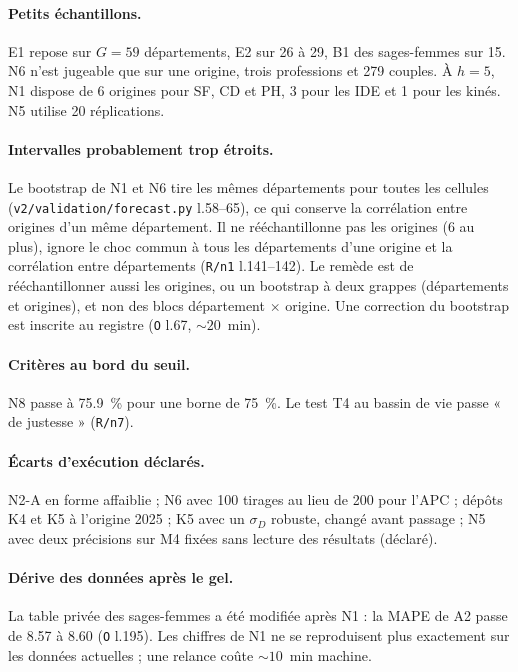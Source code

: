 \paragraph{Petits échantillons.} E1 repose sur $G = 59$\mesure{} départements, E2 sur 26 à
29\mesure, B1 des sages-femmes sur 15\mesure. N6 n'est jugeable que sur une origine, trois
professions et 279\derive{} couples. À $h = 5$, N1 dispose de 6\derive{} origines pour SF, CD et
PH, 3\derive{} pour les IDE et 1\derive{} pour les kinés. N5 utilise 20\suppose{} réplications.

\paragraph{Intervalles probablement trop étroits.} Le bootstrap de N1 et N6 tire les mêmes
départements pour toutes les cellules (\texttt{v2/validation/forecast.py} l.58--65), ce qui conserve
la corrélation entre origines d'un même département. Il ne rééchantillonne pas les origines (6\mesure{}
au plus), ignore le choc commun à tous les départements d'une origine et la corrélation entre
départements (\texttt{R/n1} l.141--142). Le remède est de rééchantillonner aussi les origines, ou un
bootstrap à deux grappes (départements et origines), et non des blocs département $\times$ origine.
Une correction du bootstrap est inscrite au registre (\texttt{O} l.67, $\sim 20$\suppose{}~min).

\paragraph{Critères au bord du seuil.} N8 passe à \num{75.9}\mesure{}~\% pour une borne de
75\suppose{}~\%. Le test T4 au bassin de vie passe « de justesse » (\texttt{R/n7}).

\paragraph{Écarts d'exécution déclarés.} N2-A en forme affaiblie ; N6 avec 100\mesure{} tirages
au lieu de 200\suppose{} pour l'APC ; dépôts K4 et K5 à l'origine 2025 ; K5 avec un $\sigma_D$
robuste, changé avant passage ; N5 avec deux précisions sur M4 fixées sans lecture des résultats
(déclaré).

\paragraph{Dérive des données après le gel.} La table privée des sages-femmes a été modifiée après
N1 : la MAPE de A2 passe de \num{8.57} à \num{8.60}\mesure{} (\texttt{O} l.195). Les chiffres de N1
ne se reproduisent plus exactement sur les données actuelles ; une relance coûte
$\sim 10$\suppose{}~min machine.

